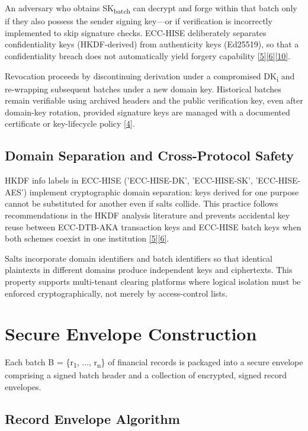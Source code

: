 \indent An adversary who obtains SK\textsubscript{batch} can decrypt and forge within that batch only if they also possess the sender signing key---or if verification is incorrectly implemented to skip signature checks. ECC-HISE deliberately separates confidentiality keys (HKDF-derived) from authenticity keys (Ed25519), so that a confidentiality breach does not automatically yield forgery capability \hyperref[ref:5]{[5]}\hyperref[ref:6]{[6]}\hyperref[ref:10]{[10]}.

\indent Revocation proceeds by discontinuing derivation under a compromised DK\textsubscript{i} and re-wrapping subsequent batches under a new domain key. Historical batches remain verifiable using archived headers and the public verification key, even after domain-key rotation, provided signature keys are managed with a documented certificate or key-lifecycle policy \hyperref[ref:4]{[4]}.

\subsection{Domain Separation and Cross-Protocol Safety}

\indent HKDF info labels in ECC-HISE ('ECC-HISE-DK', 'ECC-HISE-SK', 'ECC-HISE-AES') implement cryptographic domain separation: keys derived for one purpose cannot be substituted for another even if salts collide. This practice follows recommendations in the HKDF analysis literature and prevents accidental key reuse between ECC-DTB-AKA transaction keys and ECC-HISE batch keys when both schemes coexist in one institution \hyperref[ref:5]{[5]}\hyperref[ref:6]{[6]}.

\indent Salts incorporate domain identifiers and batch identifiers so that identical plaintexts in different domains produce independent keys and ciphertexts. This property supports multi-tenant clearing platforms where logical isolation must be enforced cryptographically, not merely by access-control lists.

\section{Secure Envelope Construction}

\indent Each batch B = \{r\textsubscript{1}, ..., r\textsubscript{n}\} of financial records is packaged into a secure envelope comprising a signed batch header and a collection of encrypted, signed record envelopes.

\subsection{Record Envelope Algorithm}

